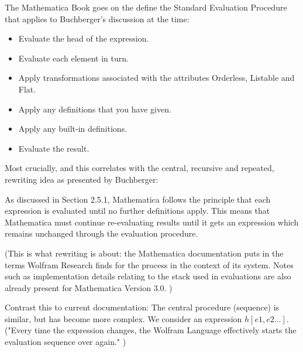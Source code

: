 The Mathematica Book goes on the define the Standard Evaluation Procedure that applies to Buchberger's discussion at the time:

\begin{displayquote}
\begin{itemize}
    \item Evaluate the head of the expression.
    \item Evaluate each element in turn.
    \item Apply transformations associated with the attributes Orderless, Listable and Flat.
    \item Apply any definitions that you have given.
    \item Apply any built-in definitions.
    \item Evaluate the result.
\end{itemize}
\cite[2.5.4 The Standard Evaluation Procedure]{noauthor_wolfram_nodate}
\end{displayquote}

Most crucially, and this correlates with the central, recursive and repeated, rewriting idea as presented by Buchberger:

\begin{displayquote}
As discussed in Section 2.5.1, Mathematica follows the principle that each expression is evaluated until no further definitions apply. This means that Mathematica must continue re-evaluating results until it gets an expression which remains unchanged through the evaluation procedure.
\cite[2.5.4 The Standard Evaluation Procedure]{noauthor_wolfram_nodate}
\end{displayquote}

(This is what rewriting is about: the Mathematica documentation puts in the terms Wolfram Research finds for the process in the context of its system. Notes such as implementation details relating to the stack used in evaluations are also already present for Mathematica Version 3.0. \cite{noauthor_wolfram_nodate})

Contrast this to current documentation: The central procedure (sequence) is similar, but has become more complex. We consider an expression \(h[e1,e2…]\). ("Every time the expression changes, the Wolfram Language effectively starts the evaluation sequence over again." \cite{noauthor_evaluationwolfram_nodate})

